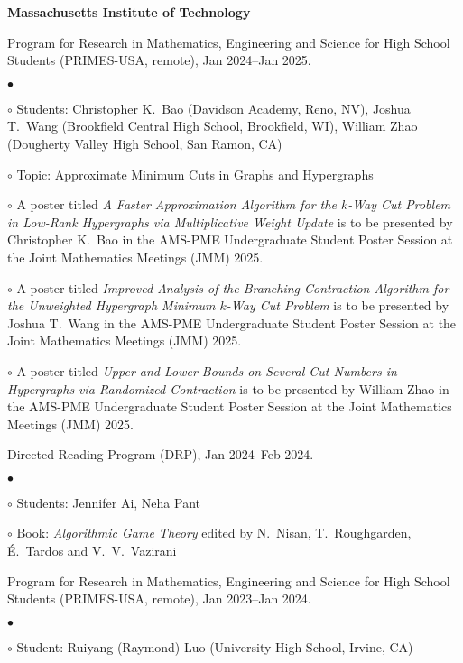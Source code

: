 \documentclass[margin,line]{res}
\newenvironment{list2}{
  \begin{list}{$\bullet$}{%
      \setlength{\itemsep}{0in}
      \setlength{\parsep}{0in} \setlength{\parskip}{0in}
      \setlength{\topsep}{0in} \setlength{\partopsep}{0in}
      \setlength{\leftmargin}{0.2in}}}{\end{list}}
\newenvironment{list3}{
  \begin{list}{\ding{113}}{%
      \setlength{\itemsep}{0.05in}
      \setlength{\parsep}{0.025in} \setlength{\parskip}{0in}
      \setlength{\topsep}{0in} \setlength{\partopsep}{0in}
      \setlength{\leftmargin}{0.17in}}}{\end{list}}
\begin{document}
\begin{resume}
{\bf Massachusetts Institute of Technology}\\
\vspace*{-.1in}
\begin{list3}
\item[] Program for Research in Mathematics, Engineering and Science for High School Students (PRIMES-USA, remote), Jan 2024--Jan 2025.
  \begin{list2}
  \item[$\circ$] Students: Christopher K.\ Bao (Davidson Academy, Reno, NV), Joshua T.\ Wang (Brookfield Central High School, Brookfield, WI), William Zhao (Dougherty Valley High School, San Ramon, CA)
  \item[$\circ$] Topic: Approximate Minimum Cuts in Graphs and Hypergraphs
  \item[$\circ$] A poster titled \emph{A Faster Approximation Algorithm for the $k$-Way Cut Problem in Low-Rank Hypergraphs via Multiplicative Weight Update} is to be presented by Christopher K.\ Bao in the AMS-PME Undergraduate Student Poster Session at the Joint Mathematics Meetings (JMM) 2025.
  \item[$\circ$] A poster titled \emph{Improved Analysis of the Branching Contraction Algorithm for the Unweighted Hypergraph Minimum $k$-Way Cut Problem} is to be presented by Joshua T.\ Wang in the AMS-PME Undergraduate Student Poster Session at the Joint Mathematics Meetings (JMM) 2025.
  \item[$\circ$] A poster titled \emph{Upper and Lower Bounds on Several Cut Numbers in Hypergraphs via Randomized Contraction} is to be presented by William Zhao in the AMS-PME Undergraduate Student Poster Session at the Joint Mathematics Meetings (JMM) 2025.
  \end{list2}
\item[] Directed Reading Program (DRP), Jan 2024--Feb 2024.
  \begin{list2}
  \item[$\circ$] Students: Jennifer Ai, Neha Pant
  \item[$\circ$] Book: \emph{Algorithmic Game Theory} edited by N.\ Nisan, T.\ Roughgarden, \'E.\ Tardos and V.\ V.\ Vazirani
  \end{list2}
\item[] Program for Research in Mathematics, Engineering and Science for High School Students (PRIMES-USA, remote), Jan 2023--Jan 2024.
  \begin{list2}
  \item[$\circ$] Student: Ruiyang (Raymond) Luo (University High School, Irvine, CA)

\end{list2}
\end{list3}
\end{resume}
\end{document}
